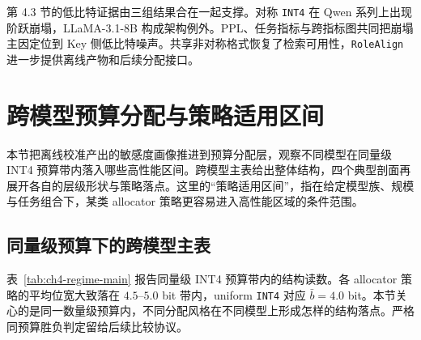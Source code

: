 第 4.3 节的低比特证据由三组结果合在一起支撑。对称 \texttt{INT4} 在 Qwen 系列上出现阶跃崩塌，LLaMA-3.1-8B 构成架构例外。PPL、任务指标与跨指标图共同把崩塌主因定位到 Key 侧低比特噪声。共享非对称格式恢复了检索可用性，\texttt{RoleAlign} 进一步提供离线产物和后续分配接口。

\section{跨模型预算分配与策略适用区间}
\label{sec:ch4-rq3}
\label{sec:exp-cross-model}
\label{sec:exp-per-model}

本节把离线校准产出的敏感度画像推进到预算分配层，观察不同模型在同量级 INT4 预算带内落入哪些高性能区间。跨模型主表给出整体结构，四个典型剖面再展开各自的层级形状与策略落点。这里的“策略适用区间”，指在给定模型族、规模与任务组合下，某类 allocator 策略更容易进入高性能区域的条件范围。

\subsection{同量级预算下的跨模型主表}
\label{subsec:ch4-regime-main}

表~\ref{tab:ch4-regime-main} 报告同量级 INT4 预算带内的结构读数。各 allocator 策略的平均位宽大致落在 $4.5\text{--}5.0$ bit 带内，uniform \texttt{INT4} 对应 $\bar b = 4.0$ bit。本节关心的是同一数量级预算内，不同分配风格在不同模型上形成怎样的结构落点。严格同预算胜负判定留给后续比较协议。

